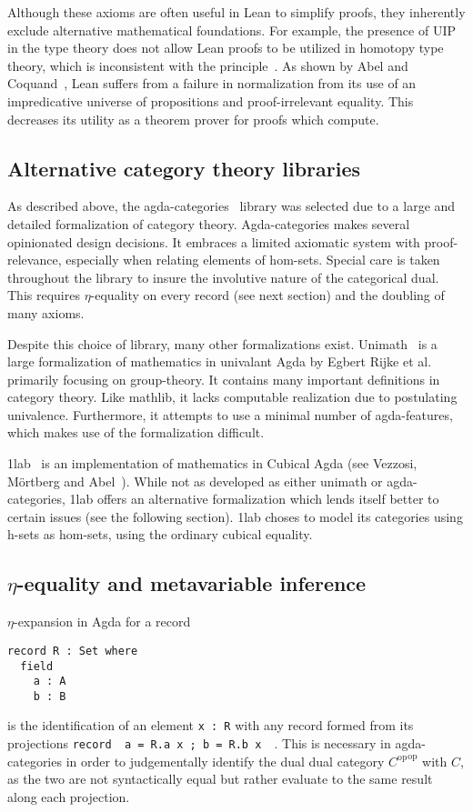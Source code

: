 \documentclass{amsart}
\theoremstyle{remark}
\DeclareMathOperator{\op}{op}
\begin{document}
Although these axioms are often useful in Lean to simplify proofs, they inherently exclude alternative mathematical foundations. For example, the presence of UIP in the type theory does not allow Lean proofs to be utilized in homotopy type theory, which is inconsistent with the principle~\cite{hottbook}. As shown by Abel and Coquand~\cite{lean-normalization}, Lean suffers from a failure in normalization from its use of an impredicative universe of propositions and proof-irrelevant equality. This decreases its utility as a theorem prover for proofs which compute.

\subsection{Alternative category theory libraries}

As described above, the agda-categories~\cite{agda:categories} library was selected due to a large and detailed formalization of category theory. Agda-categories makes several opinionated design decisions. It embraces a limited axiomatic system with proof-relevance, especially when relating elements of hom-sets. Special care is taken throughout the library to insure the involutive nature of the categorical dual. This requires $\eta$-equality on every record (see next section) and the doubling of many axioms.

Despite this choice of library, many other formalizations exist.
Unimath~\cite{agda:unimath} is a large formalization of mathematics in univalant Agda by Egbert Rijke et al. primarily focusing on group-theory. It contains many important definitions in category theory. Like mathlib, it lacks computable realization due to postulating univalence. Furthermore, it attempts to use a minimal number of agda-features, which makes use of the formalization difficult.

1lab~\cite{agda:1lab} is an implementation of mathematics in Cubical Agda (see Vezzosi, M\"{o}rtberg and Abel~\cite{agda:cubical}). While not as developed as either unimath or agda-categories, 1lab offers an alternative formalization which lends itself better to certain issues (see the following section). 1lab choses to model its categories using h-sets as hom-sets, using the ordinary cubical equality.

\subsection{\texorpdfstring{$\eta$}{eta}-equality and metavariable inference}
$\eta$-expansion in Agda for a record
\begin{verbatim}
record R : Set where
  field
    a : A
    b : B
\end{verbatim}
is the identification of an element \texttt{x : R} with any record formed from its projections \texttt{record { a = R.a x ; b = R.b x }}~\cite{agda}. This is necessary in agda-categories in order to judgementally identify the dual dual category ${C^{\op}}^{\op}$ with $C$, as the two are not syntactically equal but rather evaluate to the same result along each projection.
\end{document}
